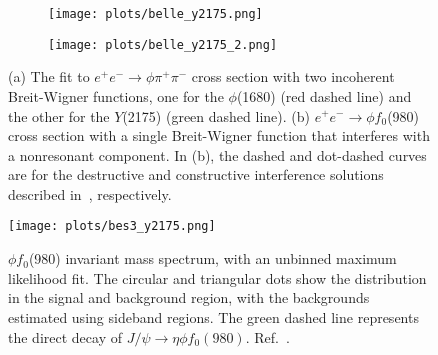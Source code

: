     \begin{figure}[H]
        \centering
        \begin{subfigure}[b]{0.47\textwidth}
            \texttt{[image: plots/belle\_y2175.png]}
            \caption{}
            \label{fig.1.4.2.a}
        \end{subfigure}\hfill
        \begin{subfigure}[b]{0.44\textwidth}
            \texttt{[image: plots/belle\_y2175\_2.png]}
            \caption{}
            \label{fig.1.4.2.b}
         \end{subfigure}
         \caption{(a) The fit to $e^+e^- \rightarrow \phi \pi^+\pi^-$ cross section with two incoherent Breit-Wigner functions, one for the $\phi$(1680) (red dashed line) and the other for the $Y$(2175) (green dashed line). (b) $e^+e^- \rightarrow \phi f_0$(980) cross section with a single Breit-Wigner function that interferes with a nonresonant component. In (b), the dashed and dot-dashed curves are for the destructive and constructive interference solutions described in~\cite{Shen09}, respectively.}
         \label{fig.1.4.2}
    \end{figure}
    
    \begin{figure}[htbp]
        \centering
            \texttt{[image: plots/bes3\_y2175.png]}
            \caption{$\phi f_0$(980) invariant mass spectrum, with an unbinned maximum likelihood fit. The circular and triangular dots show the distribution in the signal and background region, with the backgrounds estimated using sideband regions. The green dashed line represents the direct decay of $J/\psi \rightarrow \eta \phi f_0(980)$. Ref.~\cite{Ablikim15}.}
            \label{fig.1.4.3}
    \end{figure}

